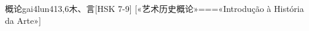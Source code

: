 \begin{EntryWithPhonetic}{概论}{gai4lun4}{13,6}{⽊、⾔}[HSK 7-9]
  [«艺术历史概论»===«Introdução à História da Arte»]
\end{EntryWithPhonetic}
